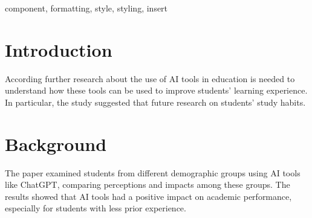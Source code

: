 \documentclass[conference]{IEEEtran}
\begin{document}
\begin{IEEEkeywords}
component, formatting, style, styling, insert
\end{IEEEkeywords}

\section{Introduction}


According \cite{LO2024105100} further research about the use of AI tools in
education is needed to understand how these tools can be used to improve
students' learning experience. In particular, the study suggested that future
research on students' study habits.






\section{Background}

The paper \cite{10343037} examined students from different demographic groups
using AI tools like ChatGPT, comparing perceptions and impacts
among these groups. The results showed that AI tools had a positive impact on
academic performance, especially for students with less prior experience.
\end{document}
